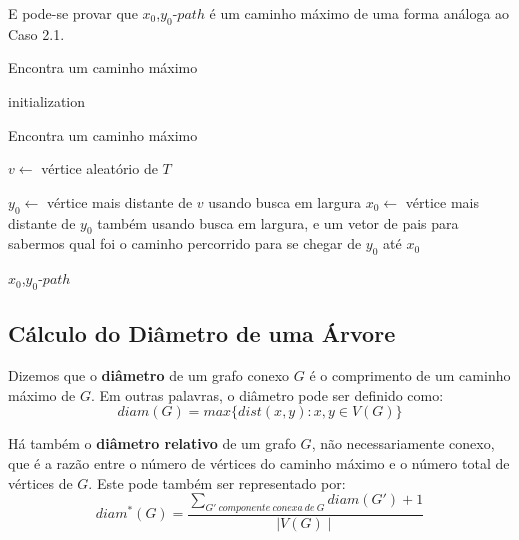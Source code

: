 \documentclass[a4paper,12pt]{article}
\begin{document}
\begin{itemize}

			E pode-se provar que $x_0$,$y_0$-$path$ é um caminho
			máximo de uma forma análoga ao Caso 2.1.


			\begin{algorithm}[H]

				\caption{Encontra um caminho máximo}
				initialization\;
			\end{algorithm}	


			\begin{algorithm}[H]

				\caption{Encontra um caminho máximo}
				$v \leftarrow$ vértice aleatório de $T$\;

				$y_0 \leftarrow$ vértice mais distante de $v$
				usando busca em largura\;
				$x_0 \leftarrow$ vértice mais distante de $y_0$
				também usando busca em largura, e um vetor de 
				pais para sabermos qual foi o caminho percorrido
				para se chegar de $y_0$ até $x_0$\;

				\Return $x_0$,$y_0$-$path$\;
				
			\end{algorithm}	




        \end{itemize}

    	\newpage


    \subsection{Cálculo do Diâmetro de uma Árvore}
    	Dizemos que o \textbf{diâmetro} de um grafo conexo $G$ é o
    	comprimento de um caminho máximo de $G$. 
    	Em outras palavras, o diâmetro pode ser definido como:
    	$$ diam(G)=max\{dist(x,y):x,y\in V(G)\} $$

    	\bigskip

    	Há também o \textbf{diâmetro relativo} de um grafo $G$,
    	não necessariamente conexo, que é a razão entre o número
    	de vértices do caminho máximo e o número total de vértices
    	de $G$. Este pode também ser representado por:
    	$$ diam^*(G) = \frac{\displaystyle\sum_{
    	G'~componente~conexa~de~G}^{}diam(G')+1}{\mid V(G)\mid} $$
    


\newpage
    
    
    
\end{document}
